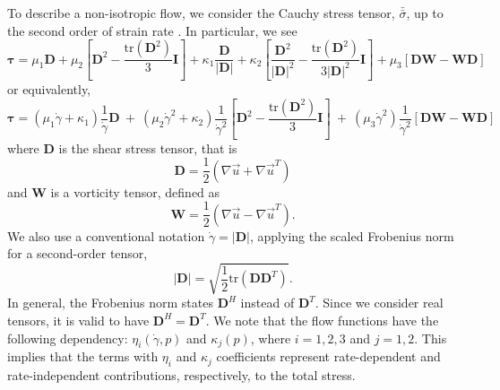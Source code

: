 To describe a non-isotropic flow, we consider the Cauchy stress tensor, $\bar{\bar{\sigma}}$, up to the second order of strain rate \cite{srivastava_viscometric_2021}. In particular, we see 
\begin{equation}
\bm{\tau} =  \mu_1 {\bm D} 
  + \mu_2  \left[ {\bm D}^2  - \frac{\text{tr}\left({\bm D}^2\right)}{3}{\bm I} \right]
 + \kappa_1 \frac{{\bm D}}{|{\bm D}|} 
  + \kappa_2  \left[ \frac{{\bm D}^2}{|{\bm D}|^2}  
  - \frac{\text{tr}\left({\bm D}^2\right)}{3|{\bm D}|^2}{\bm I} \right]
  + \mu_3  \left[ {\bm D}{\bm W} - {\bm W}{\bm D} \right]
\end{equation}
or equivalently, 
\begin{equation}
  {\bm {\bm \tau}}
  = \left( \mu_1 \dot{\gamma}+ \kappa_1 \right) \frac{1}{\dot{\gamma}} {\bm D}
  \ +  \ 
  \left( \mu_2  \dot{\gamma}^2
  +  \kappa_2 
  \right) \frac{1}{\dot{\gamma}^2}
  \left[ {\bm D}^2  - \frac{\text{tr}\left({\bm D}^2\right)}{3}{\bm I} \right]
  \ + \
  \left( \mu_3 \dot{\gamma}^2 \right)
  \frac{1}{\dot{\gamma}^2}
    \left[ {\bm D}{\bm W} - {\bm W}{\bm D} \right]
\label{eq_2ndOrder_tau}
\end{equation}
where ${\bm D} $ is the shear stress tensor, that is
\[
	{\bm D} = \frac{1}{2}\left( \nabla \vec{u} + \nabla \vec{u}^{T}\right)	
\]
and ${\bm W}$ is a vorticity tensor, defined as 
\[
	{\bm W} = \frac{1}{2}\left( \nabla \vec{u} - \nabla \vec{u}^{T}\right).
\]
We also use a conventional notation $\dot{\gamma} = \left| {\bm D} \right|$, applying the scaled Frobenius norm for a second-order tensor, 
\[
    |\bm{D}| = \sqrt{\frac{1}{2}
    \text{tr}\left(\bm{D} \bm{D}^{T} \right)}.
\]
In general, the Frobenius norm states $\bm{D}^H$ instead of $\bm{D}^T$. Since we consider real tensors, it is valid to have $\bm{D}^H = \bm{D}^T$.
We note that the flow functions have the following dependency: $\eta_i(\dot{\gamma}, p)$ and $\kappa_j (p)$, where $i = 1,2,3$ and $j = 1,2$. 
This implies that the terms with $\eta_i$ and $\kappa_j$ coefficients represent rate-dependent and rate-independent contributions, respectively, to the total stress.
